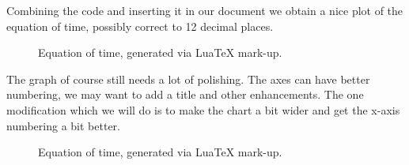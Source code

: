 Combining the code and inserting it in our document we obtain a nice plot of the equation of time, possibly correct to 12 decimal places.

\begin{figure}[htb]
\begin{scriptexample}{}{}
\bgroup
\centering
{}

\egroup
\caption{Equation of time, generated via LuaTeX mark-up.}
\end{scriptexample}
\end{figure}

The graph of course still needs a lot of polishing. The axes can have better numbering, we may want to add a title and other enhancements. The one modification which we will do is to make the chart a bit wider and get the x-axis numbering a bit better.  

\begin{figure}[htb]
\begin{scriptexample}{}{}
\bgroup
\centering
{}

\egroup
\caption{Equation of time, generated via LuaTeX mark-up.}
\end{scriptexample}
\end{figure}


